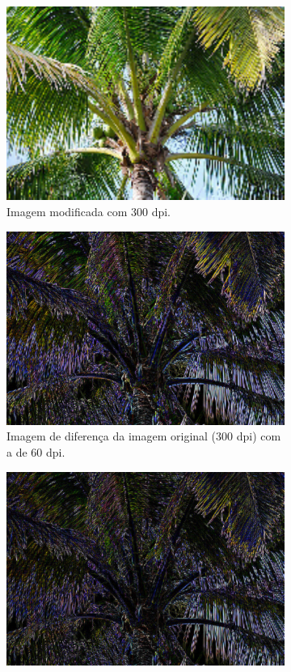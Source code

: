 \documentclass{article}
\begin{document}
\begin{figure}[H]
\begin{subfigure}[b]{0.3\textwidth}
        \includegraphics[width=\textwidth]{imgs/2.3.png}
        \caption{Imagem modificada com 300 dpi.}
    \end{subfigure}
    \hfill
    \caption{Imagens diferença do coqueiro.}
    \begin{subfigure}[b]{0.3\textwidth}
        \includegraphics[width=\textwidth]{imgs/dif2.1.png}
        \caption{Imagem de diferença da imagem original (300 dpi) com a de 60 dpi.}
    \end{subfigure}%
    \hfill
    \begin{subfigure}[b]{0.3\textwidth}
        \includegraphics[width=\textwidth]{imgs/dif2.2.png}

\end{subfigure}
\end{figure}
\end{document}
